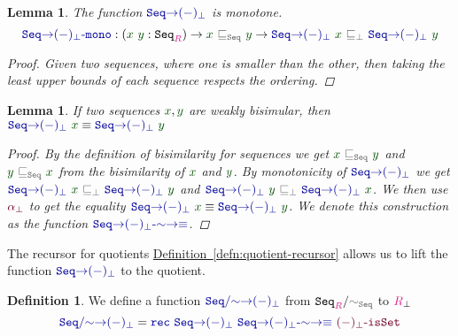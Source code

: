 \documentclass[twoside,11pt,openright]{report}
\theoremstyle{plain} %
\newtheorem{lem}[thm]{Lemma}
\theoremstyle{definition}
\newtheorem{defn}[thm]{Definition}%
\theoremstyle{remark}
\newcommand*{\defref}[1]{\hyperref[defn:#1]{Definition~\ref*{defn:#1}}}
\newcommand*{\term}[1]{\textcolor{green!30!black}{#1}} %
\newcommand*{\type}[1]{\textcolor{magenta!90!black}{#1}}
\newcommand*{\relation}[1]{\textcolor{gray!75!black}{\ensuremath{\mathtt{#1}}}}
\newcommand*{\function}[1]{\textcolor{blue!60!black}{\ensuremath{\mathtt{#1}}}}
\newcommand*{\constructor}[1]{\textcolor{purple!60!black}{\ensuremath{\mathtt{#1}}}}
\newcommand*{\typeformer}[1]{\ensuremath{\mathtt{#1}}}
\begin{document}
\begin{lem}
  The function \(\function{Seq{\rightarrow}(-)_\bot}\) is monotone. 
  \begin{equation}
    \function{Seq{\rightarrow}(-)_\bot\text{-}mono} : (\term{x}~\term{y} : \typeformer{Seq}_{\type{R}}) \rightarrow \term{x}~\relation{\sqsubseteq_{Seq}}~\term{y} \rightarrow \function{Seq{\rightarrow}(-)_\bot}~\term{x}~\relation{\sqsubseteq_{\bot}}~\function{Seq{\rightarrow}(-)_\bot}~\term{y}
\end{equation}
  \begin{proof}
    Given two sequences, where one is smaller than the other, then taking the least upper bounds of each sequence respects the ordering. %
  \end{proof}
\end{lem}
\begin{lem}
  If two sequences \(\term{x},\term{y}\) are weakly bisimular, then \(\function{Seq{\rightarrow}(-)_\bot}~\term{x} \equiv \function{Seq{\rightarrow}(-)_\bot}~\term{y}\)
  \begin{proof}
    By the definition of bisimilarity for sequences we get \(\term{x}~\relation{\sqsubseteq_{Seq}}~\term{y}\) and \(\term{y}~\relation{\sqsubseteq_{Seq}}~\term{x}\) from the bisimilarity of \(\term{x}\) and \(\term{y}\). By monotonicity of \(\function{Seq{\rightarrow}(-)_{\bot}}\) we get \(\function{Seq{\rightarrow}(-)_\bot}~\term{x}~\relation{\sqsubseteq_{\bot}}~\function{Seq{\rightarrow}(-)_\bot}~\term{y}\) and \(\function{Seq{\rightarrow}(-)_\bot}~\term{y}~\relation{\sqsubseteq_{\bot}}~\function{Seq{\rightarrow}(-)_\bot}~\term{x}\). We then use \(\constructor{\alpha_{\bot}}\) to get the equality \(\function{Seq{\rightarrow}(-)_\bot}~\term{x} \equiv \function{Seq{\rightarrow}(-)_\bot}~\term{y}\). We denote this construction as the function \(\function{Seq{\rightarrow}(-)_\bot\text{-}{\sim}{\rightarrow}{\equiv}}\).
  \end{proof}
\end{lem}
\noindent The recursor for quotients \defref{quotient-recursor} allows us to lift the function \(\function{Seq{\rightarrow}(-)_\bot}\) to the quotient.
\begin{defn}
  \label{eq:QuotientedSeqToPartialityMonad}
  We define a function \(\function{Seq/{\sim}{\rightarrow}(-)_\bot}\) from \(\typeformer{Seq}_{\type{R}} / \relation{\sim_{Seq}}\) to \(\type{R}_{\bot}\)
  \begin{equation}
    \function{Seq/{\sim}{\rightarrow}(-)_\bot} = \function{rec}~\function{Seq{\rightarrow}(-)_\bot}~\function{Seq{\rightarrow}(-)_\bot\text{-}{\sim}{\rightarrow}{\equiv}}~\constructor{(-)_\bot\text{-}isSet}
  \end{equation} 
\end{defn}
\end{document}
